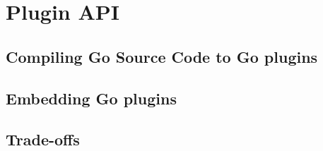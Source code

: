 \chapter{Plugin API}
\section{Compiling Go Source Code to Go plugins}
\section{Embedding Go plugins}
\section{Trade-offs}
